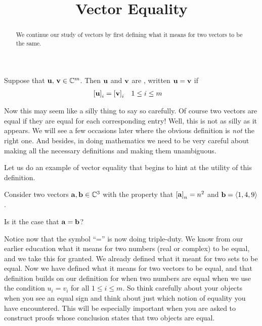 \documentclass{ximera}
\title{Vector Equality}
\begin{document}
\begin{abstract}
  We continue our study of vectors by first defining what it means for
  two vectors to be the same.
\end{abstract}
\maketitle

\begin{definition}
  Suppose that $\mathbf{u},\,\mathbf{v}\in\mathbb{C}^{m}$.  Then $\mathbf{u}$
  and $\mathbf{v}$ are , written $\mathbf{u}=\mathbf{v}$ if
  \begin{align*}
    \left\lbrack\mathbf{u}\right\rbrack_{i}&=\left\lbrack\mathbf{v}\right\rbrack_{i}
    &&1\leq i\leq m
  \end{align*}
\end{definition}

Now this may seem like a silly thing to say so carefully.  Of course
two vectors are equal if they are equal for each corresponding entry!
Well, this is not as silly as it appears.  We will see a few occasions
later where the obvious definition is \textit{not} the right one.  And
besides, in doing mathematics we need to be very careful about making
all the necessary definitions and making them unambiguous.

Let us do an example of vector equality that begins to hint at the
utility of this definition.

\begin{question}
  Consider two vectors $\mathbf{a}, \mathbf{b} \in \mathbb{C}^{3}$ with the
  property that $\left\lbrack\mathbf{a}\right\rbrack_{n} = n^2$ and
  $\mathbf{b} = \left\langle 1, 4, 9 \right\rangle$.

  Is it the case that $\mathbf{a} = \mathbf{b}$?

  \begin{multipleChoice}
  \end{multipleChoice}

  \begin{feedback}[correct]
    Notice now that the symbol ``='' is now doing triple-duty.  We
    know from our earlier education what it means for two numbers
    (real or complex) to be equal, and we take this for granted.  We
    already defined what it meant for two sets to be equal.  Now we
    have defined what it means for two vectors to be equal, and that
    definition builds on our definition for when two numbers are equal
    when we use the condition $u_i=v_i$ for all $1\leq i\leq m$.  So
    think carefully about your objects when you see an equal sign and
    think about just which notion of equality you have encountered.
    This will be especially important when you are asked to construct
    proofs whose conclusion states that two objects are equal.
  \end{feedback}

\end{question}
\end{document}
